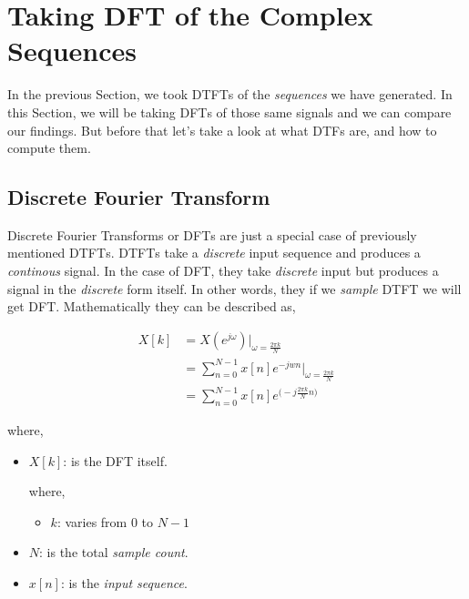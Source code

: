 \documentclass[../../course]{subfiles}
\begin{document}
\def\freqXOne{28}
\def\freqXTwo{56}
\def\freqXThree{56.1}

\def\sampFreqMuchLess{\textbf{(a):} $f_{s} = \frac{4 \times 28}{2} = 56 \si{Hz}$}
\def\sampFreqNorm{\textbf{(b):} $f_{s} = 4 \times 28 = 112 \si{Hz}$}
\def\sampFreqSligGreat{\textbf{(c):} $f_{s} = (4 \times 28) + 10 = 122 \si{Hz}$}
\def\sampFreqMuchGreat{\textbf{(d):} $f_{s} = 4 \times 28 \times 6 = 672 \si{Hz}$}

\section{Taking DFT of the Complex Sequences} \label{sec:wrkTakingDFTCplxSeqs}

In the previous Section, we took \textsc{DTFT}s of the \emph{sequences} we have
generated. In this Section, we will be taking \textsc{DFT}s of those same signals
and we can compare our findings. But before that let's take a look at what \textsc{DTF}s
are, and how to compute them.

\subsection{Discrete Fourier Transform}

Discrete Fourier Transforms or \textsc{DFT}s are just a special case of previously
mentioned \textsc{DTFT}s. \textsc{DTFT}s take a \emph{discrete} input sequence and
produces a \emph{continous} signal. In the case of \textsc{DFT}, they take \emph{discrete}
input but produces a signal in the \emph{discrete} form itself. In other words, they
if we \emph{sample} \textsc{DTFT} we will get \textsc{DFT}. Mathematically they can
be described as,

\begin{align}
    X[k] &= X(e^{j\omega}) |_{\omega = \frac{2 \pi k}{N}} \\
    &= \sum_{n = 0}^{N - 1} x[n] e^{-j w n} \bigg|_{\omega = \frac{2 \pi k}{N}} \\
    &= \sum_{n = 0}^{N - 1} x[n] e^{\big(-j \frac{2 \pi k}{N} n \big)} \label{eqn:dftK}
\end{align}

where,

\begin{itemize} [label=]
    \item $X[k]$: is the \textsc{DFT} itself.

        where,

        \begin{itemize} [label=]
            \item $k$: varies from $0$ to $N - 1$
        \end{itemize}

    \item $N$: is the total \emph{sample count}.
    \item $x[n]$: is the \emph{input sequence}.

\end{itemize}
\end{document}
